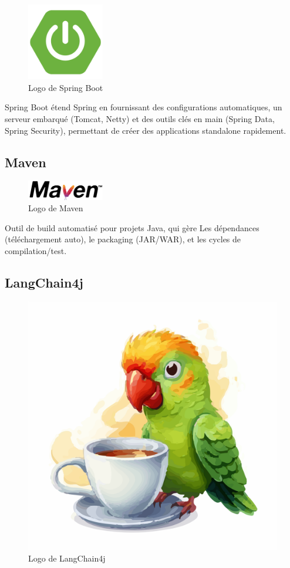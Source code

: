 \documentclass[12pt,a4paper]{report}
\begin{document}
	\begin{figure}[H]
		\centering
		\includegraphics[width=0.3\textwidth]{spring-boot-logo.png}
		\caption{Logo de Spring Boot}
		\label{fig:spring-boot-logo}
	\end{figure}
	
	Spring Boot étend Spring en fournissant des configurations automatiques, un serveur embarqué (Tomcat, Netty) et des outils clés en main (Spring Data, Spring Security), permettant de créer des applications standalone rapidement.
	
	\subsection{Maven}
	
	\begin{figure}[H]
		\centering
		\includegraphics[width=0.3\textwidth]{maven-logo.png}
		\caption{Logo de Maven}
		\label{fig:maven-logo}
	\end{figure}
	
	Outil de build automatisé pour projets Java, qui gère Les dépendances (téléchargement auto), le packaging (JAR/WAR), et les cycles de compilation/test.
	
	\subsection{LangChain4j}
	
	\begin{figure}[H]
		\centering
		\includegraphics[height=0.3\textwidth]{langchain4j-logo.png}
		\caption{Logo de LangChain4j}
		\label{fig:langchain4j-logo}
	\end{figure}
	
\end{document}
